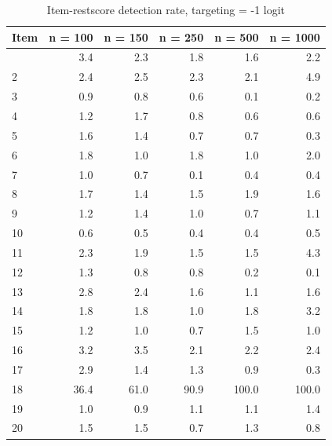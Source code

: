\documentclass[
  letterpaper,
  DIV=11,
  numbers=noendperiod]{scrartcl}
\begin{document}
\begin{longtable}[]{@{}lrrrrr@{}}

\caption{\label{tbl-irresults1}Item-restscore detection rate, targeting
= -1 logit}

\tabularnewline

\toprule\noalign{}
Item & n = 100 & n = 150 & n = 250 & n = 500 & n = 1000 \\
\midrule\noalign{}
\endhead
\bottomrule\noalign{}
\endlastfoot
1 & 3.4 & 2.3 & 1.8 & 1.6 & 2.2 \\
2 & 2.4 & 2.5 & 2.3 & 2.1 & 4.9 \\
3 & 0.9 & 0.8 & 0.6 & 0.1 & 0.2 \\
4 & 1.2 & 1.7 & 0.8 & 0.6 & 0.6 \\
5 & 1.6 & 1.4 & 0.7 & 0.7 & 0.3 \\
6 & 1.8 & 1.0 & 1.8 & 1.0 & 2.0 \\
7 & 1.0 & 0.7 & 0.1 & 0.4 & 0.4 \\
8 & 1.7 & 1.4 & 1.5 & 1.9 & 1.6 \\
9 & 1.2 & 1.4 & 1.0 & 0.7 & 1.1 \\
10 & 0.6 & 0.5 & 0.4 & 0.4 & 0.5 \\
11 & 2.3 & 1.9 & 1.5 & 1.5 & 4.3 \\
12 & 1.3 & 0.8 & 0.8 & 0.2 & 0.1 \\
13 & 2.8 & 2.4 & 1.6 & 1.1 & 1.6 \\
14 & 1.8 & 1.8 & 1.0 & 1.8 & 3.2 \\
15 & 1.2 & 1.0 & 0.7 & 1.5 & 1.0 \\
16 & 3.2 & 3.5 & 2.1 & 2.2 & 2.4 \\
17 & 2.9 & 1.4 & 1.3 & 0.9 & 0.3 \\
18 & 36.4 & 61.0 & 90.9 & 100.0 & 100.0 \\
19 & 1.0 & 0.9 & 1.1 & 1.1 & 1.4 \\
20 & 1.5 & 1.5 & 0.7 & 1.3 & 0.8 \\

\end{longtable}
\end{document}
